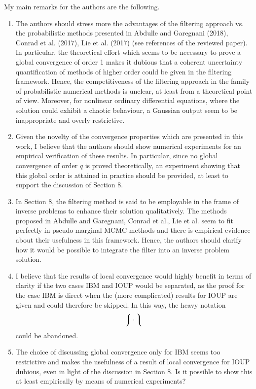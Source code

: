 \documentclass{article}
\begin{document}
My main remarks for the authors are the following.
\begin{enumerate}
\item The authors should stress more the advantages of the filtering approach vs. the probabilistic methods presented in Abdulle and Garegnani (2018), Conrad et al. (2017), Lie et al. (2017) (see references of the reviewed paper). In particular, the theoretical effort which seems to be necessary to prove a global convergence of order 1 makes it dubious that a coherent uncertainty quantification of methods of higher order could be given in the filtering framework. Hence, the competitiveness of the filtering approach in the family of probabilistic numerical methods is unclear, at least from a theoretical point of view. Moreover, for nonlinear ordinary differential equations, where the solution could exhibit a chaotic behaviour, a Gaussian output seem to be inappropriate and overly restrictive.
\item Given the novelty of the convergence properties which are presented in this work, I believe that the authors should show numerical experiments for an empirical verification of these results. In particular, since no global convergence of order $q$ is proved theoretically, an experiment showing that this global order is attained in practice should be provided, at least to support the discussion of Section 8.
\item In Section 8, the filtering method is said to be employable in the frame of inverse problems to enhance their solution qualitatively. The methods proposed in Abdulle and Garegnani, Conrad et al., Lie et al. seem to fit perfectly in pseudo-marginal MCMC methods and there is empirical evidence about their usefulness in this framework. Hence, the authors should clarify how it would be possible to integrate the filter into an inverse problem solution.
\item I believe that the results of local convergence would highly benefit in terms of clarity if the two cases IBM and IOUP would be separated, as the proof for the case IBM is direct when the (more complicated) results for IOUP are given and could therefore be skipped. In this way, the heavy notation 
\[
\big\lmoustache\cdot\big\rmoustache
\] 
could be abandoned.
\item The choice of discussing global convergence only for IBM seems too restrictive and makes the usefulness of a result of local convergence for IOUP dubious, even in light of the discussion in Section 8. Is it possible to show this at least empirically by means of numerical experiments?

\end{enumerate}
\end{document}
